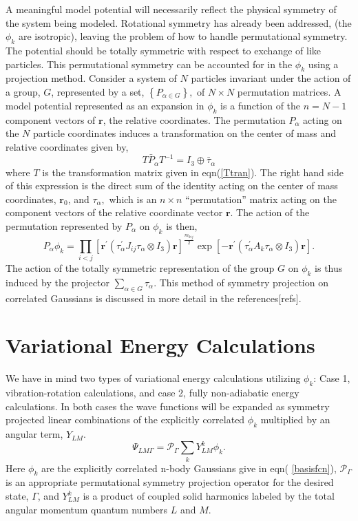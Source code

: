 \documentclass[12pt,thmsa]{article}
\begin{document}
A meaningful model potential will necessarily reflect the physical symmetry
of the system being modeled. Rotational symmetry has already been addressed,
(the $\phi _k$ are isotropic), leaving the problem of how to handle
permutational symmetry. The potential should be totally symmetric with
respect to exchange of like particles. This permutational symmetry can be
accounted for in the $\phi _k$ using a projection method. Consider a system
of $N$ particles invariant under the action of a group, $G$, represented by
a set, $\left\{ P_{\alpha \in G}\right\} ,$ of $N\times N$ permutation
matrices. A model potential represented as an expansion in $\phi _k$ is a
function of the $n=N-1$ component vectors of $\mathbf{r}$, the relative
coordinates. The permutation $P_\alpha $ acting on the $N$ particle
coordinates induces a transformation on the center of mass and relative
coordinates given by, 
\begin{equation}
T\bar{P}_\alpha T^{-1}=I_3\oplus \bar{\tau}_\alpha
\end{equation}
where $T$ is the transformation matrix given in eqn(\ref{Ttran}). The right
hand side of this expression is the direct sum of the identity acting on the
center of mass coordinates, $\mathbf{r}_0$, and $\tau _\alpha ,$ which is an 
$n\times n$ ``permutation'' matrix acting on the component vectors of the
relative coordinate vector $\mathbf{r}$. The action of the permutation
represented by $P_\alpha $ on $\phi _k$ is then, 
\begin{equation}
P_\alpha \phi _k=\prod_{i<j}\left[ \mathbf{r}^{\prime }(\tau _\alpha
^{\prime }J_{ij}\tau _\alpha \otimes I_3)\mathbf{r}\right] ^{\frac{m_{kij}}%
2}\exp \left[ -\mathbf{r}^{\prime }(\tau _\alpha ^{\prime }A_k\tau _\alpha
\otimes I_3)\mathbf{r}\right] .
\end{equation}
The action of the totally symmetric representation of the group $G$ on $\phi
_k$ is thus induced by the projector $\sum_{\alpha \in G}\tau _\alpha .$
This method of symmetry projection on correlated Gaussians is discussed in
more detail in the references[refs].

\section{Variational Energy Calculations}

We have in mind two types of variational energy calculations utilizing $\phi
_k$: Case 1, vibration-rotation calculations, and case 2, fully
non-adiabatic energy calculations. In both cases the wave functions will be
expanded as symmetry projected linear combinations of the explicitly
correlated $\phi _k$ multiplied by an angular term, $Y_{LM}.$ 
\begin{equation}
\Psi _{LM\Gamma }=\mathcal{P}_\Gamma \sum_kY_{LM}^k\phi _k.  \label{wf}
\end{equation}
Here $\phi _k$ are the explicitly correlated n-body Gaussians give in eqn(%
\ref{basisfcn}), $\mathcal{P}_\Gamma $ is an appropriate permutational
symmetry projection operator for the desired state, $\Gamma $, and $Y_{LM}^k$
is a product of coupled solid harmonics labeled by the total angular
momentum quantum numbers $L$ and $M$.
\end{document}

